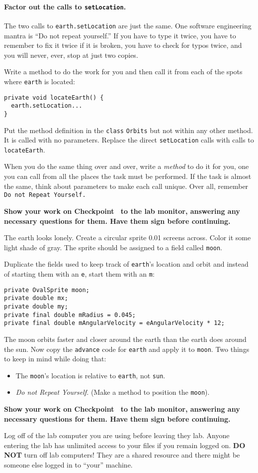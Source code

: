 \documentclass[12pt,twoside]{memoir}
\newenvironment{Checkpoint}[1]{%
\begin{Exercise}[name={Checkpoint},title={#1}]}{%
\end{Exercise}%
\textbf{Show your work on Checkpoint~\theExercise{} to the lab monitor, %
  answering any necessary questions for them.  Have them sign before continuing.}}
\begin{document}
\begin{Checkpoint}{Define a method.}
\paragraph{Factor out the calls to \texttt{setLocation}.}
The two calls to \texttt{earth.setLocation} are just the same. One
software engineering mantra is ``Do not repeat yourself.'' If you have
to type it twice, you have to remember to fix it twice if it is
broken, you have to check for typos twice, and you will never, ever,
stop at just two copies.

Write a method to do the work for you and then call it from each of
the spots where \texttt{earth} is located:

\begin{lstlisting}
private void locateEarth() {
  earth.setLocation...
}
\end{lstlisting}

Put the method definition in the \texttt{class} \texttt{Orbits} but
not within any other method. It is called with no parameters. Replace
the direct \texttt{setLocation} calls with calls to \texttt{locateEarth}.

When you do the same thing over and over, write a \emph{method} to do
it for you, one you can call from all the places the task must be
performed. If the task is almost the same, think about parameters to
make each call unique. Over all, remember \texttt{Do not Repeat Yourself.}
\end{Checkpoint}

\begin{Checkpoint}{Let there be Moon}
The earth looks lonely. Create a circular sprite 0.01 screens
across. Color it some light shade of gray. The sprite should be
assigned to a field called \texttt{moon}. 

Duplicate the fields used to keep track of \texttt{earth}'s location
and orbit and instead of starting them with an \texttt{e}, start them
with an \texttt{m}:

\begin{lstlisting}
private OvalSprite moon;
private double mx;
private double my;
private final double mRadius = 0.045;
private final double mAngularVelocity = eAngularVelocity * 12;
\end{lstlisting}

The moon orbits faster and closer around the earth than the earth does
around the sun. Now copy the \texttt{advance} code for \texttt{earth}
and apply it to \texttt{moon}. Two things to keep in mind while doing
that:
\begin{itemize}
\item The \texttt{moon}'s location is relative to \texttt{earth}, not
  \texttt{sun}.
\item \emph{Do not Repeat Yourself.} (Make a method to position the
  \texttt{moon}). 
\end{itemize}
\end{Checkpoint}

\Large{Log off of the lab computer you are using before leaving they
  lab. Anyone entering the lab has unlimited access to your files if
  you remain logged on. \textbf{DO NOT} turn off lab computers! They
  are a shared resource and there might be someone else logged in to
  ``your'' machine.}
\end{document}
